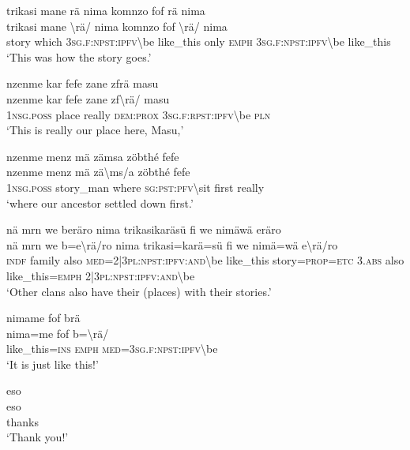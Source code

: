 \ea\label{ex:2:a1738}
trikasi mane rä nima komnzo fof rä nima\\
\gll trikasi	mane	{\textbackslash}rä/	nima	komnzo	fof	{\textbackslash}rä/	nima\\
     story	which	3\textsc{sg}.\textsc{f}:\textsc{npst}:\textsc{ipfv}{\textbackslash}be	like\_this	only	\textsc{emph}	3\textsc{sg}.\textsc{f}:\textsc{npst}:\textsc{ipfv}{\textbackslash}be	like\_this\\
\glt `This was how the story goes.'
\z

\ea\label{ex:2:a1740}
nzenme kar fefe zane zfrä masu\\
\gll nzenme	kar	fefe	zane	zf{\textbackslash}rä/	masu\\
     1\textsc{nsg}.\textsc{poss}	place	really	\textsc{dem}:\textsc{prox}	3\textsc{sg}.\textsc{f}:\textsc{rpst}:\textsc{ipfv}{\textbackslash}be	\textsc{pln}\\
\glt `This is really our place here, Masu,'
\z

\ea\label{ex:2:a1741}
nzenme menz mä zämsa zöbthé fefe\\
\gll nzenme	menz	mä	zä{\textbackslash}ms/a	zöbthé	fefe\\
     1\textsc{nsg}.\textsc{poss}	story\_man	where	\textsc{sg}:\textsc{pst}:\textsc{pfv}{\textbackslash}sit	first	really\\
\glt `where our ancestor settled down first.'
\z

\ea\label{ex:2:a1743}
nä mrn we beräro nima trikasikaräsü fi we nimäwä eräro\\
\gll nä	mrn	we	b=e{\textbackslash}rä/ro	nima	trikasi=karä=sü	fi	we	nimä=wä	e{\textbackslash}rä/ro\\
     \textsc{indf}	family	also	\textsc{med}=2|3\textsc{pl}:\textsc{npst}:\textsc{ipfv}:\textsc{and}{\textbackslash}be	like\_this	story=\textsc{prop}=\textsc{etc}	3.\textsc{abs}	also	like\_this=\textsc{emph}	2|3\textsc{pl}:\textsc{npst}:\textsc{ipfv}:\textsc{and}{\textbackslash}be\\
\glt `Other clans also have their (places) with their stories.'
\z

\ea\label{ex:2:a1744}
nimame fof brä\\
\gll nima=me	fof	b={\textbackslash}rä/\\
     like\_this=\textsc{ins}	\textsc{emph}	\textsc{med}=3\textsc{sg}.\textsc{f}:\textsc{npst}:\textsc{ipfv}{\textbackslash}be\\
\glt `It is just like this!'
\z

\ea\label{ex:2:a1745}
eso\\
\gll eso\\
     thanks\\
\glt `Thank you!'
\z
